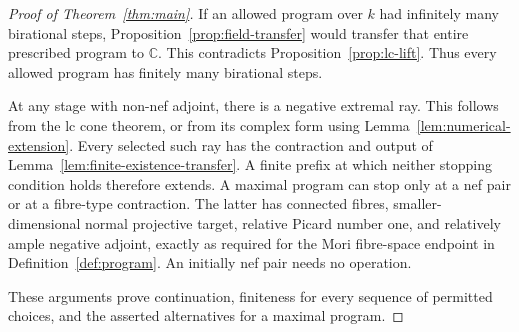 \begin{proof}[Proof of Theorem~\ref{thm:main}]
If an allowed program over $k$ had infinitely many birational
steps, Proposition~\ref{prop:field-transfer} would transfer
that entire prescribed program to $\mathbb C$.  This contradicts
Proposition~\ref{prop:lc-lift}.  Thus every allowed program
has finitely many birational steps.

At any stage with non-nef adjoint, there is a negative
extremal ray.  This follows from the lc cone theorem, or from
its complex form using Lemma~\ref{lem:numerical-extension}.
Every selected such ray has the contraction and output of
Lemma~\ref{lem:finite-existence-transfer}.  A finite
prefix at which neither stopping condition holds therefore extends.  A maximal program
can stop only at a nef pair or at a fibre-type contraction.
The latter has connected fibres, smaller-dimensional normal
projective target, relative Picard number one, and relatively
ample negative adjoint, exactly as required for the Mori
fibre-space endpoint in Definition~\ref{def:program}.
An initially nef pair needs no operation.

These arguments prove continuation, finiteness for every sequence of
permitted choices, and the asserted alternatives for a maximal program.
\end{proof}
